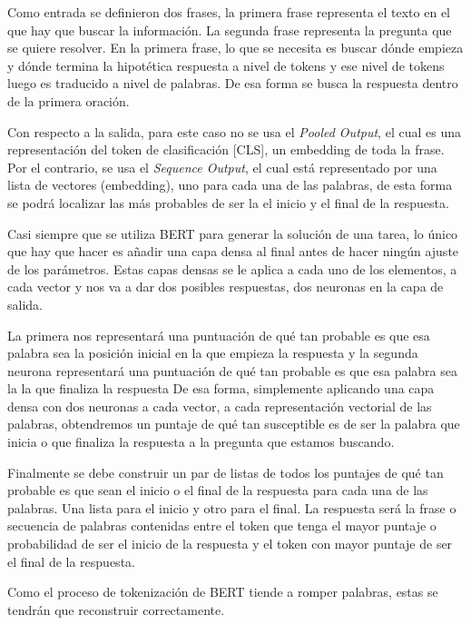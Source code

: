 Como entrada se definieron dos frases, la primera frase representa el texto en el que hay que buscar la información. La segunda frase representa la pregunta que se quiere resolver. En la primera frase, lo que se necesita es buscar dónde empieza y dónde termina la hipotética respuesta a nivel de tokens y ese nivel de tokens luego es traducido a nivel de palabras. De esa forma se busca la respuesta dentro de la primera oración.

Con respecto a la salida, para este caso no se usa el \textit{Pooled Output}, el cual es una representación del token de clasificación [CLS], un embedding de toda la frase. Por el contrario, se usa el \textit{Sequence Output}, el cual está representado por una lista de vectores (embedding), uno para cada una de las palabras, de esta forma se podrá localizar las más probables de ser la el inicio y el final de la respuesta.

Casi siempre que se utiliza BERT para generar la solución de una tarea, lo único que hay que hacer es añadir una capa densa al final antes de hacer ningún ajuste de los parámetros. Estas capas densas se le aplica a cada uno de los elementos, a cada vector y nos va a dar dos posibles respuestas, dos neuronas en la capa de salida.

La primera nos representará una puntuación de qué tan probable es que esa palabra sea la posición inicial en la que empieza la respuesta y la segunda neurona representará una puntuación de qué tan probable es que esa palabra sea la la que finaliza la respuesta De esa forma, simplemente aplicando una capa densa con dos neuronas a cada vector, a cada representación vectorial de las palabras, obtendremos un puntaje de qué tan susceptible es de ser la palabra que inicia o que finaliza la respuesta a la pregunta que estamos buscando.

Finalmente se debe construir un par de listas de todos los puntajes de qué tan probable es que sean el inicio o el final de la respuesta para cada una de las palabras. Una lista para el inicio y otro para el final. La respuesta será la frase o secuencia de palabras contenidas entre el token que tenga el mayor puntaje o probabilidad de ser el inicio de la respuesta y el token con mayor puntaje de ser el final de la respuesta.

Como el proceso de tokenización de BERT tiende a romper palabras, estas se tendrán que reconstruir correctamente.

